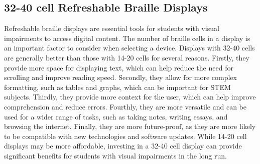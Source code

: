 \documentclass[14pt,letterpaper,twoside]{extreport}
\begin{document}
\pagebreak 
\hypertarget{cell-refreshable-braille-displays}{}\subsection{32-40 cell Refreshable Braille
	  Displays}\label{cell-refreshable-braille-displays}
Refreshable braille displays are essential tools for students with visual impairments to access digital content. The number of braille cells in a display is an important factor to consider when selecting a device. Displays with 32-40 cells are generally better than those with 14-20 cells for several reasons. Firstly, they provide more space for displaying text, which can help reduce the need for scrolling and improve reading speed. Secondly, they allow for more complex formatting, such as tables and graphs, which can be important for STEM subjects. Thirdly, they provide more context for the user, which can help improve comprehension and reduce errors. Fourthly, they are more versatile and can be used for a wider range of tasks, such as taking notes, writing essays, and browsing the internet. Finally, they are more future-proof, as they are more likely to be compatible with new technologies and software updates. While 14-20 cell displays may be more affordable, investing in a 32-40 cell display can provide significant benefits for students with visual impairments in the long run.
\end{document}
